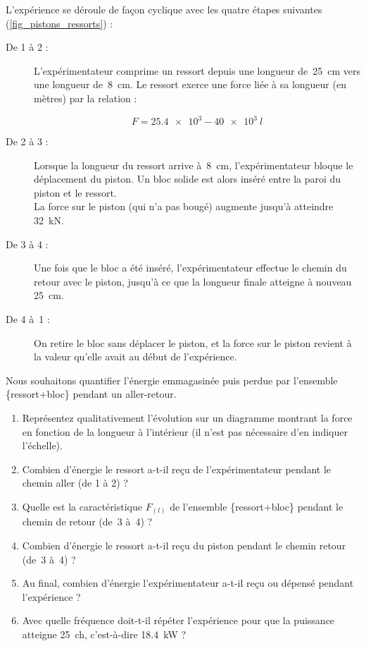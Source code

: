 	L’expérience se déroule de façon cyclique avec les quatre étapes suivantes (\cref{fig_pistons_ressorts}) :
	
	\begin{description}
		\item[De 1 à 2 :] L’expérimentateur comprime un ressort depuis une longueur de~\SI{25}{\centi\metre} vers une longueur de~\SI{8}{\centi\metre}.
		Le ressort exerce une force liée à sa longueur (en mètres) par la relation :
		
		\begin{equation}
			F = \num{25,4e3} - \num{40e3} \ l
		\end{equation}
		

		\item[De 2 à 3 :] Lorsque la longueur du ressort arrive à~\SI{8}{\centi\metre}, l’expérimentateur bloque le déplacement du piston. Un bloc solide est alors inséré entre la paroi du piston et le ressort. \\
		La force sur le piston (qui n’a pas bougé) augmente jusqu’à atteindre \SI{32}{\kilo\newton}.
		
		\item[De 3 à 4 :] Une fois que le bloc a été inséré, l’expérimentateur effectue le chemin du retour avec le piston, jusqu’à ce que la longueur finale atteigne à nouveau \SI{25}{\centi\metre}.
		
		\item[De 4 à~1 :] On retire le bloc sans déplacer le piston, et la force sur le piston revient à la valeur qu’elle avait au début de l’expérience.
	\end{description}
	
	Nous souhaitons quantifier l’énergie emmagasinée puis perdue par l’ensemble \{ressort+bloc\} pendant un aller-retour. 
	
	\begin{enumerate}
		\item Représentez qualitativement l’évolution sur un diagramme montrant la force en fonction de la longueur à l’intérieur  (il n’est pas nécessaire d’en indiquer l’échelle).
		\item Combien d’énergie le ressort a-t-il reçu de l’expérimentateur pendant le chemin aller (de 1 à 2) ?
		\item Quelle est la caractéristique $F_{(l)}$ de l’ensemble \{ressort+bloc\} pendant le chemin de retour (de~3 à~4) ?
		\item Combien d’énergie le ressort a-t-il reçu du piston pendant le chemin retour (de~3 à~4) ?
		\item Au final, combien d’énergie l’expérimentateur a-t-il reçu ou dépensé pendant l’expé\-rience ?
		\item Avec quelle fréquence doit-t-il répéter l’expérience pour que la puissance atteigne \SI{25}{ch}, c’est-à-dire \SI{18,4}{\kilo\watt} ?
	\end{enumerate}


